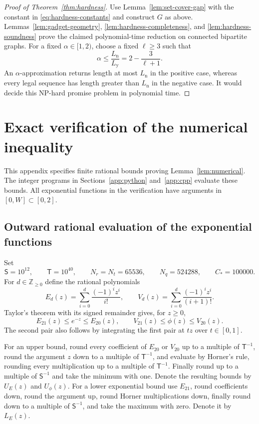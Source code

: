 \documentclass[11pt]{article}
\numberwithin{equation}{section}
\theoremstyle{definition}
\newcommand{\Z}{\mathbb Z}
\begin{document}
\begin{proof}[Proof of Theorem~\ref{thm:hardness}]
Use Lemma~\ref{lem:set-cover-gap} with the constant in
\eqref{eq:hardness-constants} and construct $G$ as above.
Lemmas~\ref{lem:gadget-geometry},
\ref{lem:hardness-completeness}, and
\ref{lem:hardness-soundness} prove the claimed polynomial-time
reduction on connected bipartite graphs.
For a fixed $\alpha\in[1,2)$, choose a fixed $\ell\ge3$ such that
\[
 \alpha\le\frac{L_{\mathrm n}}{L_{\mathrm y}}
          =2-\frac3{\ell+1}.
\]
An $\alpha$-approximation returns length at most $L_{\mathrm n}$ in
the positive case, whereas every legal sequence has length greater
than $L_{\mathrm n}$ in the negative case. It would decide this
NP-hard promise problem in polynomial time.
\end{proof}


\appendix
\section{Exact verification of the numerical inequality}
\label{app:certificate}

This appendix specifies finite rational bounds proving
Lemma~\ref{lem:numerical}. The integer programs in
Sections~\ref{app:python} and~\ref{app:cpp} evaluate these bounds.
All exponential functions in the verification have arguments in
$[0,W]\subset[0,2]$.

\subsection{Outward rational evaluation of the exponential functions}

Set
\[
 \mathsf S=10^{12},\qquad \mathsf T=10^{40},\qquad
 N_r=N_t=65536,\qquad N_q=524288,\qquad C_*=100000.
\]
For $d\in\Z_{\ge0}$ define the rational polynomials
\[
 E_d(z)=\sum_{i=0}^d\frac{(-1)^iz^i}{i!},
 \qquad V_d(z)=\sum_{i=0}^d\frac{(-1)^iz^i}{(i+1)!}.
\]
Taylor's theorem with its signed remainder gives, for $z\ge0$,
\begin{equation}\label{eq:taylor-bounds}
 E_{21}(z)\le e^{-z}\le E_{20}(z),\qquad
 V_{21}(z)\le\phi(z)\le V_{20}(z).
\end{equation}
The second pair also follows by integrating the first pair at $tz$
over $t\in[0,1]$.

For an upper bound, round every coefficient of $E_{20}$ or $V_{20}$
up to a multiple of $\mathsf T^{-1}$, round the argument $z$ down
to a multiple of $\mathsf T^{-1}$, and evaluate by Horner's rule,
rounding every multiplication up to a multiple of $\mathsf T^{-1}$.
Finally round up to a multiple of $\mathsf S^{-1}$ and take the minimum
with one. Denote the resulting bounds by $U_E(z)$ and $U_\phi(z)$.
For a lower exponential bound use $E_{21}$, round coefficients down,
round the argument up, round Horner multiplications down, finally
round down to a multiple of $\mathsf S^{-1}$, and take the maximum
with zero. Denote it by $L_E(z)$.
\end{document}
